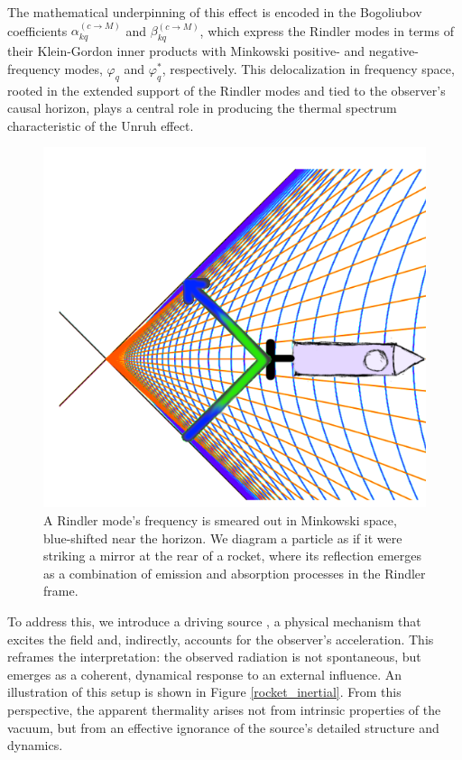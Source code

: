 \documentclass[12pt,a4paper]{article}
\begin{document}
The mathematical underpinning of this effect is encoded in the Bogoliubov coefficients $\alpha_{kq}^{(c \rightarrow M)}$ and $\beta_{kq}^{(c \rightarrow M)}$, which express the Rindler modes in terms of their Klein-Gordon inner products with Minkowski positive- and negative-frequency modes, $\varphi_q$ and $\varphi_q^*$, respectively. This delocalization in frequency space, rooted in the extended support of the Rindler modes and tied to the observer’s causal horizon, plays a central role in producing the thermal spectrum characteristic of the Unruh effect.

\begin{figure}[h]
\centering
\includegraphics[scale=1.5]{emit_absorb.png}
\captionsetup{width=0.7\textwidth}
\caption{
  A Rindler mode's frequency is smeared out in Minkowski space, blue-shifted near the horizon. We diagram a particle as if it were striking a mirror at the rear of a rocket, where its reflection emerges as a combination of emission and absorption processes in the Rindler frame.}
\label{emit_absorb}
\end{figure}

To address this, we introduce a driving source \cite{Schwinger_1966} \cite{ryder1996quantum}, a physical mechanism that excites the field and, indirectly, accounts for the observer's acceleration. This reframes the interpretation: the observed radiation is not spontaneous, but emerges as a coherent, dynamical response to an external influence. An illustration of this setup is shown in Figure \ref{rocket_inertial}. From this perspective, the apparent thermality arises not from intrinsic properties of the vacuum, but from an effective ignorance of the source's detailed structure and dynamics.
\end{document}
